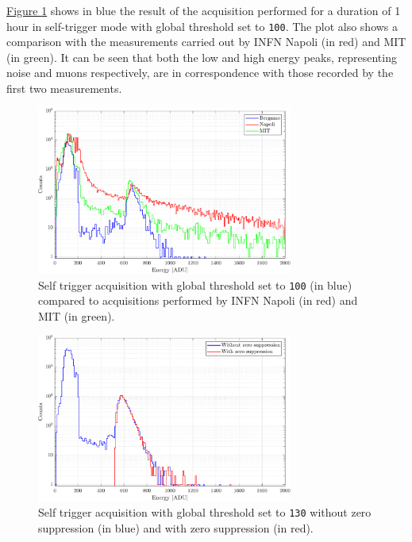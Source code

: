 \par
\hyperref[figMUONSconfronto]{Figure \ref{figMUONSconfronto}} shows in blue the result of the acquisition performed for a duration of 1 hour in self-trigger mode with global threshold set to \texttt{100}. The plot also shows a comparison with the measurements carried out by INFN Napoli (in red) and MIT (in green). It can be seen that both the low and high energy peaks, representing noise and muons respectively, are in correspondence with those recorded by the first two measurements.

\begin{figure}[h!]
    \centering
    \includegraphics[width=0.75\textwidth]{Images/chap3/results/muons/incoming_energy_comparison.pdf}
    \caption{ Self trigger acquisition with global threshold set to \texttt{100} (in blue) compared to acquisitions performed by INFN Napoli (in red) and MIT (in green).}
    \label{figMUONSconfronto}
\end{figure}

\begin{figure}[h!]
    \centering
    \includegraphics[width=0.75\textwidth]{Images/chap3/results/muons/incoming_energy_zero_suppr_thr130.pdf}
    \caption{Self trigger acquisition with global threshold set to \texttt{130} without zero suppression (in blue) and with zero suppression (in red).}
    \label{figMUONselfZS}
\end{figure}

